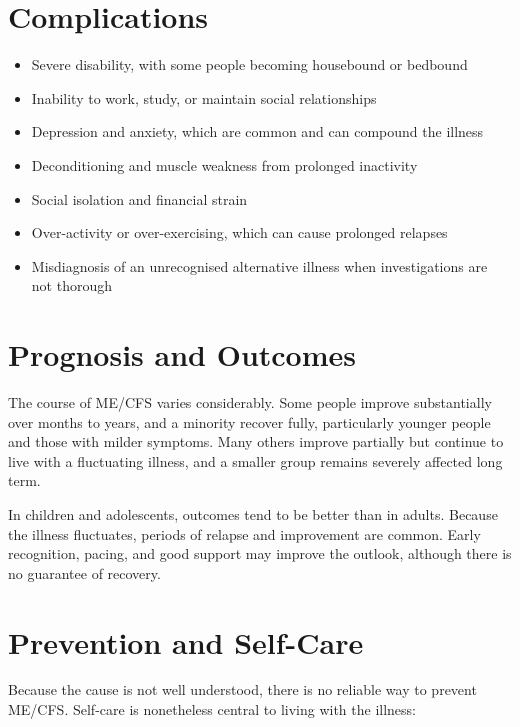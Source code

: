 \section*{Complications}
\begin{itemize}
    \item Severe disability, with some people becoming housebound or bedbound
    \item Inability to work, study, or maintain social relationships
    \item Depression and anxiety, which are common and can compound the illness
    \item Deconditioning and muscle weakness from prolonged inactivity
    \item Social isolation and financial strain
    \item Over-activity or over-exercising, which can cause prolonged relapses
    \item Misdiagnosis of an unrecognised alternative illness when investigations are not thorough
\end{itemize}

\section*{Prognosis and Outcomes}
The course of ME/CFS varies considerably. Some people improve substantially over months to years, and a minority recover fully, particularly younger people and those with milder symptoms. Many others improve partially but continue to live with a fluctuating illness, and a smaller group remains severely affected long term.

In children and adolescents, outcomes tend to be better than in adults. Because the illness fluctuates, periods of relapse and improvement are common. Early recognition, pacing, and good support may improve the outlook, although there is no guarantee of recovery.

\section*{Prevention and Self-Care}
Because the cause is not well understood, there is no reliable way to prevent ME/CFS. Self-care is nonetheless central to living with the illness:

